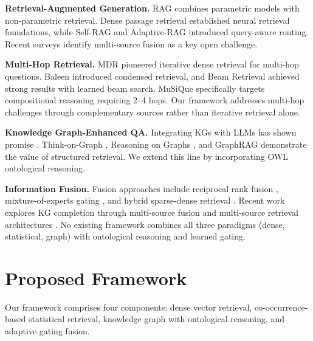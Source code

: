 \documentclass[preprint,12pt]{elsarticle}
\begin{document}
\textbf{Retrieval-Augmented Generation.} RAG \citep{lewis2020retrieval} combines parametric models with non-parametric retrieval. Dense passage retrieval \citep{karpukhin2020dense} established neural retrieval foundations, while Self-RAG \citep{asai2024selfrag} and Adaptive-RAG \citep{jeong2024adaptive} introduced query-aware routing. Recent surveys \citep{gao2024retrieval,zhao2024retrieval} identify multi-source fusion as a key open challenge.

\textbf{Multi-Hop Retrieval.} MDR \citep{xiong2021answering} pioneered iterative dense retrieval for multi-hop questions. Baleen \citep{khattab2021baleen} introduced condensed retrieval, and Beam Retrieval \citep{zhao2024beam} achieved strong results with learned beam search. MuSiQue \citep{trivedi2022musique} specifically targets compositional reasoning requiring 2--4 hops. Our framework addresses multi-hop challenges through complementary sources rather than iterative retrieval alone.

\textbf{Knowledge Graph-Enhanced QA.} Integrating KGs with LLMs has shown promise \citep{pan2024unifying,hogan2021knowledge}. Think-on-Graph \citep{sun2024thinkongraph}, Reasoning on Graphs \citep{luo2024reasoning}, and GraphRAG \citep{edge2024local} demonstrate the value of structured retrieval. We extend this line by incorporating OWL ontological reasoning.

\textbf{Information Fusion.} Fusion approaches include reciprocal rank fusion \citep{cormack2009rrf}, mixture-of-experts gating \citep{shazeer2017outrageously,jacobs1991adaptive}, and hybrid sparse-dense retrieval \citep{ma2023hybrid,robertson2009probabilistic}. Recent work explores KG completion through multi-source fusion \citep{meng2024knowledge} and multi-source retrieval architectures \citep{guan2024mirag}. No existing framework combines all three paradigms (dense, statistical, graph) with ontological reasoning and learned gating.

\section{Proposed Framework}
\label{sec:framework}

Our framework comprises four components: dense vector retrieval, co-occurrence-based statistical retrieval, knowledge graph with ontological reasoning, and adaptive gating fusion.
\end{document}
